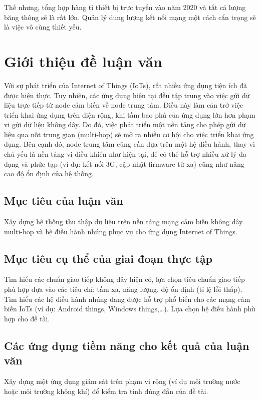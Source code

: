 \begin{itemize}
Thế nhưng, tổng hợp hàng tỉ thiết bị trực tuyến vào năm 2020 và tất cả lượng băng thông sẽ là rất lớn. Quản lý dung lượng kết nối mạng một cách cẩn trọng sẽ là việc vô cùng thiết yếu.
\end{itemize}

\section{Giới thiệu đề luận văn}
Với sự phát triển của Internet of Things (IoTs), rất nhiều ứng dụng tiện ích đã được hiện thực. Tuy nhiên, các ứng dụng hiện tại đều tập trung vào việc gửi dữ liệu trực tiếp từ node cảm biến về node trung tâm. Điều này làm cản trở việc triển khai ứng dụng trên diện rộng, khi tầm bao phủ của ứng dụng lớn hơn phạm vi gửi dữ liệu không dây. Do đó, việc phát triển một nền tảng cho phép gửi dữ liệu qua nốt trung gian (multi-hop) sẽ mở ra nhiều cơ hội cho việc triển khai ứng dụng. Bên cạnh đó, node trung tâm cũng cần dựa trên một hệ điều hành, thay vì chủ yếu là nền tảng vi điều khiển như hiện tại, để có thể hỗ trợ nhiều xử lý đa dạng và phức tạp (ví dụ: kết nối 3G, cập nhật firmware từ xa) cũng như nâng cao độ ổn định của hệ thống.\\
\subsection{Mục tiêu của luận văn}
Xây dựng hệ thống thu thập dữ liệu trên nền tảng mạng cảm biến không dây multi-hop và hệ điều hành nhúng phục vụ cho ứng dụng Internet of Things.
\subsection{Mục tiêu cụ thể của giai đoạn thực tập}
Tìm hiểu các chuẩn giao tiếp không dây hiện có, lựa chọn tiêu chuẩn giao tiếp phù hợp dựa vào các tiêu chí: tầm xa, năng lượng, độ ổn định (tỉ lệ lỗi thấp).
\newline
Tìm hiểu các hệ điều hành nhúng đang được hỗ trợ phổ biến cho các mạng cảm biến IoTs (ví dụ: Android things, Windows things,…). Lựa chọn hệ điều hành phù hợp cho đề tài.
\subsection{Các ứng dụng tiềm năng cho kết quả của luận văn}
Xây dựng một ứng dụng giám sát trên phạm vi rộng (ví dụ môi trường nước hoặc môi trường không khí) để kiểm tra tính đúng đắn của đề tài.




